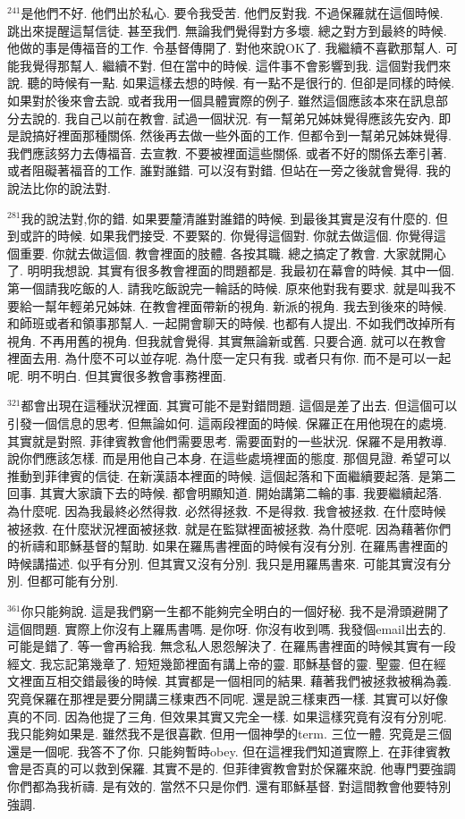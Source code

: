\documentclass{book}
\begin{document}
$^{241}$是他們不好.
他們出於私心.
要令我受苦.
他們反對我.
不過保羅就在這個時候.
跳出來提醒這幫信徒.
甚至我們.
無論我們覺得對方多壞.
總之對方到最終的時候.
他做的事是傳福音的工作.
令基督傳開了.
對他來說OK了.
我繼續不喜歡那幫人.
可能我覺得那幫人.
繼續不對.
但在當中的時候.
這件事不會影響到我.
這個對我們來說.
聽的時候有一點.
如果這樣去想的時候.
有一點不是很行的.
但卻是同樣的時候.
如果對於後來會去說.
或者我用一個具體實際的例子.
雖然這個應該本來在訊息部分去說的.
我自己以前在教會.
試過一個狀況.
有一幫弟兄姊妹覺得應該先安內.
即是說搞好裡面那種關係.
然後再去做一些外面的工作.
但都令到一幫弟兄姊妹覺得.
我們應該努力去傳福音.
去宣教.
不要被裡面這些關係.
或者不好的關係去牽引著.
或者阻礙著福音的工作.
誰對誰錯.
可以沒有對錯.
但站在一旁之後就會覺得.
我的說法比你的說法對.

$^{281}$我的說法對,你的錯.
如果要釐清誰對誰錯的時候.
到最後其實是沒有什麼的.
但到或許的時候.
如果我們接受.
不要緊的.
你覺得這個對.
你就去做這個.
你覺得這個重要.
你就去做這個.
教會裡面的肢體.
各按其職.
總之搞定了教會.
大家就開心了.
明明我想說.
其實有很多教會裡面的問題都是.
我最初在幕會的時候.
其中一個.
第一個請我吃飯的人.
請我吃飯說完一輪話的時候.
原來他對我有要求.
就是叫我不要給一幫年輕弟兄姊妹.
在教會裡面帶新的視角.
新派的視角.
我去到後來的時候.
和師班或者和領事那幫人.
一起開會聊天的時候.
也都有人提出.
不如我們改掉所有視角.
不再用舊的視角.
但我就會覺得.
其實無論新或舊.
只要合適.
就可以在教會裡面去用.
為什麼不可以並存呢.
為什麼一定只有我.
或者只有你.
而不是可以一起呢.
明不明白.
但其實很多教會事務裡面.

$^{321}$都會出現在這種狀況裡面.
其實可能不是對錯問題.
這個是差了出去.
但這個可以引發一個信息的思考.
但無論如何.
這兩段裡面的時候.
保羅正在用他現在的處境.
其實就是對照.
菲律賓教會他們需要思考.
需要面對的一些狀況.
保羅不是用教導.
說你們應該怎樣.
而是用他自己本身.
在這些處境裡面的態度.
那個見證.
希望可以推動到菲律賓的信徒.
在新漢語本裡面的時候.
這個起落和下面繼續要起落.
是第二回事.
其實大家讀下去的時候.
都會明顯知道.
開始講第二輪的事.
我要繼續起落.
為什麼呢.
因為我最終必然得救.
必然得拯救.
不是得救.
我會被拯救.
在什麼時候被拯救.
在什麼狀況裡面被拯救.
就是在監獄裡面被拯救.
為什麼呢.
因為藉著你們的祈禱和耶穌基督的幫助.
如果在羅馬書裡面的時候有沒有分別.
在羅馬書裡面的時候講描述.
似乎有分別.
但其實又沒有分別.
我只是用羅馬書來.
可能其實沒有分別.
但都可能有分別.

$^{361}$你只能夠說.
這是我們窮一生都不能夠完全明白的一個好秘.
我不是滑頭避開了這個問題.
實際上你沒有上羅馬書嗎.
是你呀.
你沒有收到嗎.
我發個email出去的.
可能是錯了.
等一會再給我.
無念私人恩怨解決了.
在羅馬書裡面的時候其實有一段經文.
我忘記第幾章了.
短短幾節裡面有講上帝的靈.
耶穌基督的靈.
聖靈.
但在經文裡面互相交錯最後的時候.
其實都是一個相同的結果.
藉著我們被拯救被稱為義.
究竟保羅在那裡是要分開講三樣東西不同呢.
還是說三樣東西一樣.
其實可以好像真的不同.
因為他提了三角.
但效果其實又完全一樣.
如果這樣究竟有沒有分別呢.
我只能夠如果是.
雖然我不是很喜歡.
但用一個神學的term.
三位一體.
究竟是三個還是一個呢.
我答不了你.
只能夠暫時obey.
但在這裡我們知道實際上.
在菲律賓教會是否真的可以救到保羅.
其實不是的.
但菲律賓教會對於保羅來說.
他專門要強調你們都為我祈禱.
是有效的.
當然不只是你們.
還有耶穌基督.
對這間教會他要特別強調.
\end{document}
